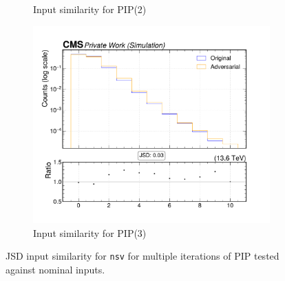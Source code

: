\begin{figure}[htbp]
\begin{subfigure}[t]{0.32\textwidth}
    \caption{Input similarity for PIP(2)}
  \end{subfigure}\hfill
  \begin{subfigure}[t]{0.32\textwidth}
    \includegraphics[width=\linewidth]{media/output/features/compare/intprob_3/cmp_global_features_nsv.pdf}
    \caption{Input similarity for PIP(3)}
  \end{subfigure}

  \caption{JSD input similarity for \texttt{nsv} for multiple iterations of PIP tested against nominal inputs.}
  \label{fig:intprob_input_nsv}
\end{figure}
